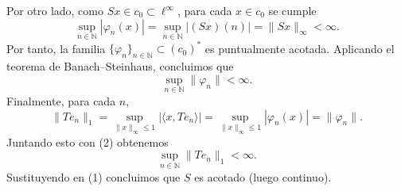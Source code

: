 \documentclass[12pt]{article}
\begin{document}
\begin{ejercicio}[2 puntos]
\begin{description}
            Por otro lado, como $Sx\in c_0\subset \ell^\infty$, para cada $x\in c_0$ se cumple
            \begin{equation*}
            \sup_{n\in\mathbb N}|\varphi_n(x)|
            =\sup_{n\in\mathbb N}|(Sx)(n)|
            =\|Sx\|_\infty
            <\infty.
            \end{equation*}
            Por tanto, la familia $\{\varphi_n\}_{n\in\mathbb N}\subset (c_0)^\ast$ es puntualmente acotada.
            Aplicando el teorema de Banach--Steinhaus, concluimos que
            \begin{equation*}
            \sup_{n\in\mathbb N}\|\varphi_n\|<\infty.
            \tag{2}
            \end{equation*}
            Finalmente, para cada $n$,
            \begin{equation*}
            \|Te_n\|_1
            = \sup_{\|x\|_\infty\le 1} |\langle x,Te_n\rangle|
            = \sup_{\|x\|_\infty\le 1} |\varphi_n(x)|
            =\|\varphi_n\|.
            \end{equation*}
            Juntando esto con (2) obtenemos
            \begin{equation*}
            \sup_{n\in\mathbb N}\|Te_n\|_1<\infty.
            \end{equation*}
            Sustituyendo en (1) concluimos que $S$ es acotado (luego continuo).
                    

\end{description}
\end{ejercicio}
\end{document}
